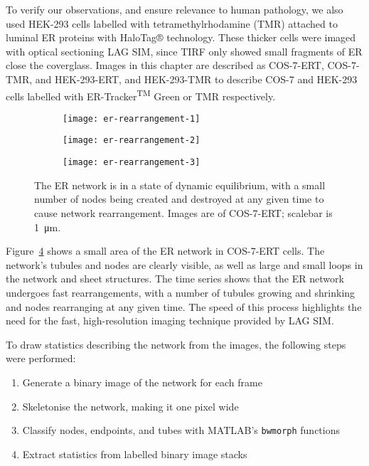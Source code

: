 To verify our observations, and ensure relevance to human pathology, we also used HEK-293 cells labelled with tetramethylrhodamine (TMR) attached to luminal ER proteins with HaloTag® technology. 
These thicker cells were imaged with optical sectioning LAG SIM, since TIRF only showed small fragments of ER close the coverglass. 
Images in this chapter are described as COS-7-ERT, COS-7-TMR, and HEK-293-ERT, and HEK-293-TMR to describe COS-7 and HEK-293 cells labelled with ER-Tracker\textsuperscript{TM} Green or TMR respectively. 

\begin{figure}[htbp!]
\centering
\begin{subfigure}[b]{0.325\textwidth}
	\texttt{[image: er-rearrangement-1]}
	\caption{}\label{fig:er-rearrangement-1}
\end{subfigure}\hfill
\begin{subfigure}[b]{0.325\textwidth}
	\texttt{[image: er-rearrangement-2]}
	\caption{}\label{fig:er-rearrangement-2}
\end{subfigure}\hfill
\begin{subfigure}[b]{0.325\textwidth}
	\texttt{[image: er-rearrangement-3]}
	\caption{}\label{fig:er-rearrangement-3}
\end{subfigure}
\caption[ER: Growing and shrinking tubules show the ER network is in a state of dynamic equilibrium]{The ER network is in a state of dynamic equilibrium, with a small number of nodes being created and destroyed at any given time to cause network rearrangement. Images are of COS-7-ERT; scalebar is \SI{1}{\micro\metre}. } 
\label{fig:ER-rearrangement}
\end{figure}

Figure~\ref{fig:ER-rearrangement} shows a small area of the ER network in COS-7-ERT cells. 
The network's tubules and nodes are clearly visible, as well as large and small loops in the network and sheet structures. 
The time series shows that the ER network undergoes fast rearrangements, with a number of tubules growing and shrinking and nodes rearranging at any given time. 
The speed of this process highlights the need for the fast, high-resolution imaging technique provided by LAG SIM. 

To draw statistics describing the network from the images, the following steps were performed:
\begin{enumerate}
	\item Generate a binary image of the network for each frame
	\item Skeletonise the network, making it one pixel wide
	\item Classify nodes, endpoints, and tubes with MATLAB's \texttt{bwmorph} functions
	\item Extract statistics from labelled binary image stacks
\end{enumerate}

